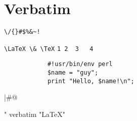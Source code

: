 \documentclass{article}
\begin{document}
    \section{Verbatim}
        \verb"\/{}#$%&~!"\par
        \verb!\LaTeX \& \TeX!
        \verb*"1 2  3   4"
        \begin{verbatim}
            #!usr/bin/env perl
            $name = "guy"; 
            print "Hello, $name!\n"; 
        \end{verbatim}
        \usebox\verbbox \fbox{\usebox\verbbox}\par
        % Package fancyvrb provides some special commands help us do the above. 
        |#$@$%
        \par
        \cprotect{}\par
        {                               %
            \MakeShortVerb"             %
            verbatim "\LaTeX"
        }
\end{document}
